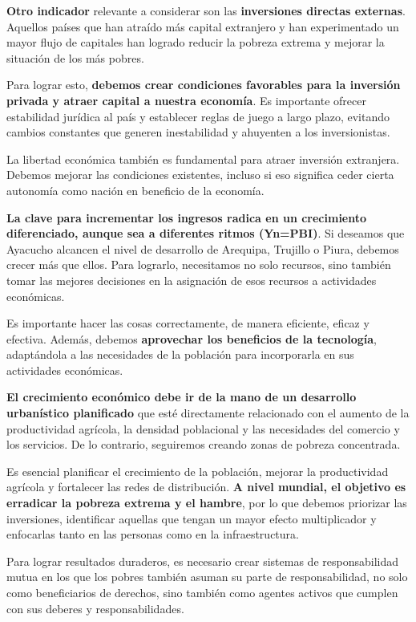 \documentclass[
  jou,
  floatsintext,
  longtable,
  a4paper,
  nolmodern,
  notxfonts,
  notimes,
  12pt,
  colorlinks=true,linkcolor=blue,citecolor=blue,urlcolor=blue]{apa7}
\begin{document}
\textbf{Otro indicador} relevante a considerar son las
\textbf{inversiones directas externas}. Aquellos países que han atraído
más capital extranjero y han experimentado un mayor flujo de capitales
han logrado reducir la pobreza extrema y mejorar la situación de los más
pobres.

Para lograr esto, \textbf{debemos crear condiciones favorables para la
inversión privada y atraer capital a nuestra economía}. Es importante
ofrecer estabilidad jurídica al país y establecer reglas de juego a
largo plazo, evitando cambios constantes que generen inestabilidad y
ahuyenten a los inversionistas.

La libertad económica también es fundamental para atraer inversión
extranjera. Debemos mejorar las condiciones existentes, incluso si eso
significa ceder cierta autonomía como nación en beneficio de la
economía.

\textbf{La clave para incrementar los ingresos radica en un crecimiento
diferenciado, aunque sea a diferentes ritmos (Yn=PBI)}. Si deseamos que
Ayacucho alcancen el nivel de desarrollo de Arequipa, Trujillo o Piura,
debemos crecer más que ellos. Para lograrlo, necesitamos no solo
recursos, sino también tomar las mejores decisiones en la asignación de
esos recursos a actividades económicas.

Es importante hacer las cosas correctamente, de manera eficiente, eficaz
y efectiva. Además, debemos \textbf{aprovechar los beneficios de la
tecnología}, adaptándola a las necesidades de la población para
incorporarla en sus actividades económicas.

\textbf{El crecimiento económico debe ir de la mano de un desarrollo
urbanístico planificado} que esté directamente relacionado con el
aumento de la productividad agrícola, la densidad poblacional y las
necesidades del comercio y los servicios. De lo contrario, seguiremos
creando zonas de pobreza concentrada.

Es esencial planificar el crecimiento de la población, mejorar la
productividad agrícola y fortalecer las redes de distribución. \textbf{A
nivel mundial, el objetivo es erradicar la pobreza extrema y el hambre},
por lo que debemos priorizar las inversiones, identificar aquellas que
tengan un mayor efecto multiplicador y enfocarlas tanto en las personas
como en la infraestructura.

Para lograr resultados duraderos, es necesario crear sistemas de
responsabilidad mutua en los que los pobres también asuman su parte de
responsabilidad, no solo como beneficiarios de derechos, sino también
como agentes activos que cumplen con sus deberes y responsabilidades.
\end{document}
